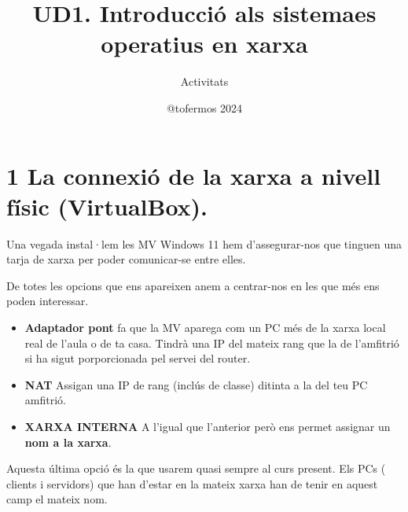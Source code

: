 \documentclass[
  a4paper,
]{article}
\title{UD1. Introducció als sistemaes operatius en xarxa}
\subtitle{Activitats}
\author{@tofermos 2024}
\date{}
\begin{document}
\maketitle

{
\setcounter{tocdepth}{2}
\tableofcontents
}
\section{1 La connexió de la xarxa a nivell físic
(VirtualBox).}\label{la-connexiuxf3-de-la-xarxa-a-nivell-fuxedsic-virtualbox.}

Una vegada instal·lem les MV Windows 11 hem d'assegurar-nos que tinguen
una tarja de xarxa per poder comunicar-se entre elles.

De totes les opcions que ens apareixen anem a centrar-nos en les que més
ens poden interessar.

\begin{itemize}
\item
  \textbf{Adaptador pont} fa que la MV aparega com un PC més de la xarxa
  local real de l'aula o de ta casa. Tindrà una IP del mateix rang que
  la de l'amfitrió si ha sigut porporcionada pel servei del router.
\item
  \textbf{NAT} Assigan una IP de rang (inclús de classe) ditinta a la
  del teu PC amfitrió.
\item
  \textbf{XARXA INTERNA} A l'igual que l'anterior però ens permet
  assignar un \textbf{nom a la xarxa}.
\end{itemize}

Aquesta última opció és la que usarem quasi sempre al curs present. Els
PCs ( clients i servidors) que han d'estar en la mateix xarxa han de
tenir en aquest camp el mateix nom.
\end{document}
